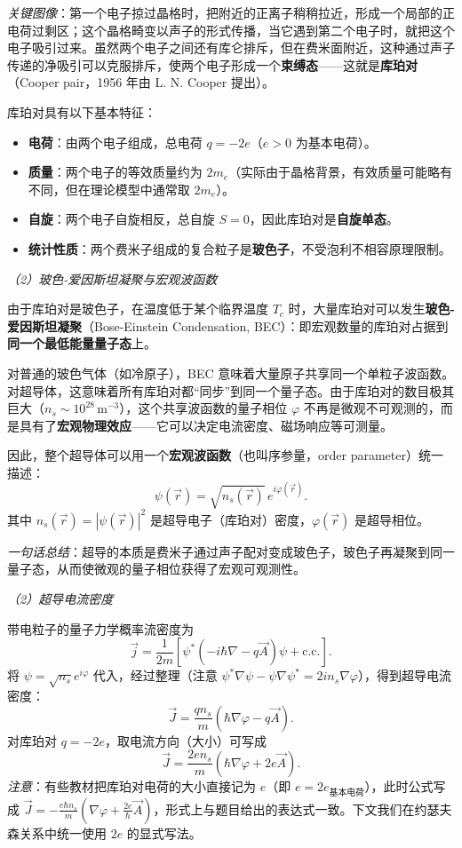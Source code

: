 \textit{关键图像}：第一个电子掠过晶格时，把附近的正离子稍稍拉近，形成一个局部的正电荷过剩区；这个晶格畸变以声子的形式传播，当它遇到第二个电子时，就把这个电子吸引过来。虽然两个电子之间还有库仑排斥，但在费米面附近，这种通过声子传递的净吸引可以克服排斥，使两个电子形成一个\textbf{束缚态}——这就是\textbf{库珀对}（Cooper pair，1956 年由 L. N. Cooper 提出）。

库珀对具有以下基本特征：
\begin{itemize}[nosep]
    \item \textbf{电荷}：由两个电子组成，总电荷 $q = -2e$（$e>0$ 为基本电荷）。
    \item \textbf{质量}：两个电子的等效质量约为 $2m_e$（实际由于晶格背景，有效质量可能略有不同，但在理论模型中通常取 $2m_e$）。
    \item \textbf{自旋}：两个电子自旋相反，总自旋 $S=0$，因此库珀对是\textbf{自旋单态}。
    \item \textbf{统计性质}：两个费米子组成的复合粒子是\textbf{玻色子}，不受泡利不相容原理限制。
\end{itemize}

\textit{（2）玻色-爱因斯坦凝聚与宏观波函数}

由于库珀对是玻色子，在温度低于某个临界温度 $T_c$ 时，大量库珀对可以发生\textbf{玻色-爱因斯坦凝聚}（Bose-Einstein Condensation, BEC）：即宏观数量的库珀对占据到\textbf{同一个最低能量量子态}上。

对普通的玻色气体（如冷原子），BEC 意味着大量原子共享同一个单粒子波函数。对超导体，这意味着所有库珀对都``同步''到同一个量子态。由于库珀对的数目极其巨大（$n_s \sim 10^{28}\,\text{m}^{-3}$），这个共享波函数的量子相位 $\varphi$ 不再是微观不可观测的，而是具有了\textbf{宏观物理效应}——它可以决定电流密度、磁场响应等可测量。

因此，整个超导体可以用一个\textbf{宏观波函数}（也叫序参量，order parameter）统一描述：
\[
\boxed{\psi(\vec{r}) = \sqrt{n_s(\vec{r})}\, e^{i\varphi(\vec{r})}}.
\]
其中 $n_s(\vec{r}) = |\psi(\vec{r})|^2$ 是超导电子（库珀对）密度，$\varphi(\vec{r})$ 是超导相位。

\textit{一句话总结}：超导的本质是费米子通过声子配对变成玻色子，玻色子再凝聚到同一量子态，从而使微观的量子相位获得了宏观可观测性。

\textit{（2）超导电流密度}

带电粒子的量子力学概率流密度为
\[
\vec{j} = \frac{1}{2m}\left[ \psi^*(-i\hbar\nabla - q\vec{A})\psi + \text{c.c.} \right].
\]
将 $\psi = \sqrt{n_s}e^{i\varphi}$ 代入，经过整理（注意 $\psi^*\nabla\psi - \psi\nabla\psi^* = 2in_s\nabla\varphi$），得到超导电流密度：
\[
\boxed{\vec{J} = \frac{q n_s}{m}(\hbar\nabla\varphi - q\vec{A})}.
\]
对库珀对 $q=-2e$，取电流方向（大小）可写成
\[
\vec{J} = \frac{2e n_s}{m}\left(\hbar\nabla\varphi + 2e\vec{A}\right).
\]
\textit{注意}：有些教材把库珀对电荷的大小直接记为 $e$（即 $e = 2e_{\text{基本电荷}}$），此时公式写成 $\vec{J} = -\frac{e\hbar n_s}{m}(\nabla\varphi + \frac{2e}{\hbar}\vec{A})$，形式上与题目给出的表达式一致。下文我们在约瑟夫森关系中统一使用 $2e$ 的显式写法。

